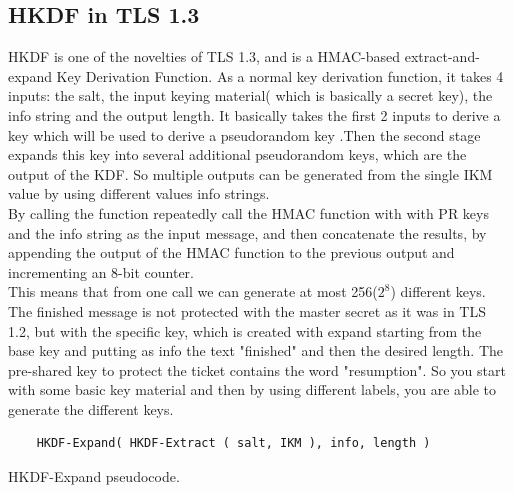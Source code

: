 \subsection{HKDF in TLS 1.3}
HKDF is one of the novelties of TLS 1.3, and is a HMAC-based
extract-and-expand Key Derivation Function. As a normal key derivation
function, it takes 4 inputs: the salt, the input keying material(
which is basically a secret key), the info string and the output
length. It basically takes the first 2 inputs to derive a key which
will be used to derive a pseudorandom key .Then the second stage
expands this key into several additional pseudorandom keys, which are
the output of the KDF. So multiple outputs can be generated from the
single IKM value by using different values info strings.\\
By calling the function repeatedly call the HMAC function with with PR
keys and the info string as the input message, and then concatenate 
the results, by appending the output of the HMAC function to the 
previous output and incrementing an 8-bit counter.\\
This means that from one call we can generate at most 256($2^8$)
different keys.\\
The finished message is not protected with the master secret as it was
in TLS 1.2, but with the specific key, which is created with expand
starting from the base key and putting as info the text "finished" and
then the desired length. The pre-shared key to protect the ticket
contains the word "resumption". So you start with some basic key
material and then by using different labels, you are able to generate
the different keys.

\begin{listing}[H]
  \begin{verbatim}
    HKDF-Expand( HKDF-Extract ( salt, IKM ), info, length )
  \end{verbatim}
  \caption{HKDF-Expand pseudocode.}
  \label{lst:hkdf-expand}
\end{listing}

